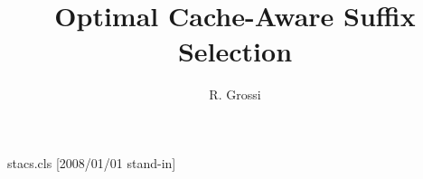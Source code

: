 \begin{filecontents*}{stacs.cls}
[2008/01/01 stand-in]
\renewcommand{\address}[2][]{\g@addto@macro\addresses{\address{#1}{#2}}}
\renewcommand{\curraddr}[2][]{\g@addto@macro\addresses{\curraddr{#1}{#2}}}
\renewcommand{\email}[2][]{\g@addto@macro\addresses{\email{#1}{#2}}}
\renewcommand{\urladdr}[2][]{\g@addto@macro\addresses{\urladdr{#1}{#2}}}
\def\@setaddresses{\par\begingroup\def\address##1##2{##2\par}%
  \def\curraddr##1##2{Current address: ##2\par}\def\email##1##2{E-mail address: ##2\par}%
  \def\urladdr##1##2{URL: ##2\par}\addresses\endgroup}
\def\@maketitle{\@settitle\ifx\@empty\authors\else\@setauthors\fi\@setaddresses}
\def\enddoc@text{}
\end{filecontents*}
\documentclass{stacs}

\title{Optimal Cache-Aware Suffix Selection}
\author{R. Grossi}
\address{Dipartimento di Informatica, Universita di Pisa}
\maketitle
Body.

